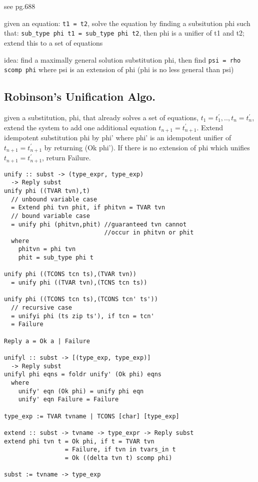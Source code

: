 \documentclass[8pt]{extarticle}
\begin{document}
\begin{multicols*}{2}
see \cite{grune2012} pg.688

given an equation: \verb|t1 = t2|, solve the equation by finding a subsitution phi such that: \verb|sub_type phi t1 = sub_type phi t2|, then phi is a unifier of t1 and t2; extend this to a set of equations

idea: find a maximally general solution substitution phi, then find \verb|psi = rho scomp phi| where psi is an extension of phi (phi is no less general than psi)

\vfill\null
\columnbreak

\subsection{Robinson's Unification Algo.}
given a substitution, phi, that already solves a set of equations, $t_1=t_1^{\prime}, .., t_n=t_n^{\prime}$, extend the system to add one additional equation $t_{n+1}=t_{n+1}^{\prime}$. Extend idempotent substitution phi by phi' where phi' is an idempotent unifier of $t_{n+1}=t_{n+1}^{\prime}$ by returning (Ok phi'). If there is no extension of phi which unifies $t_{n+1}=t_{n+1}^{\prime}$, return Failure.

\begin{verbatim}
unify :: subst -> (type_expr, type_exp)
  -> Reply subst
unify phi ((TVAR tvn),t)
  // unbound variable case
  = Extend phi tvn phit, if phitvn = TVAR tvn
  // bound variable case
  = unify phi (phitvn,phit) //guaranteed tvn cannot
                            //occur in phitvn or phit
  where
    phitvn = phi tvn
    phit = sub_type phi t

unify phi ((TCONS tcn ts),(TVAR tvn))
  = unify phi ((TVAR tvn),(TCNS tcn ts))

unify phi ((TCONS tcn ts),(TCONS tcn' ts'))
  // recursive case
  = unifyi phi (ts zip ts'), if tcn = tcn'
  = Failure

Reply a = Ok a | Failure

unifyl :: subst -> [(type_exp, type_exp)]
  -> Reply subst
unifyl phi eqns = foldr unify' (Ok phi) eqns
  where
    unify' eqn (Ok phi) = unify phi eqn
    unify' eqn Failure = Failure

type_exp := TVAR tvname | TCONS [char] [type_exp]

extend :: subst -> tvname -> type_expr -> Reply subst
extend phi tvn t = Ok phi, if t = TVAR tvn
                 = Failure, if tvn in tvars_in t
                 = Ok ((delta tvn t) scomp phi)

subst := tvname -> type_exp


\end{verbatim}
\end{multicols*}
\end{document}
